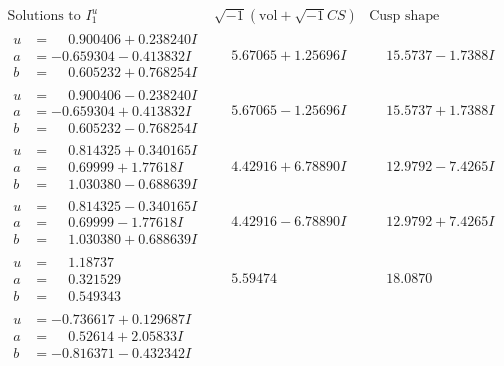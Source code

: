 \documentclass[1p]{elsarticle_modified}
\theoremstyle{definition}
\newcommand{\I}{\sqrt{-1}}
\begin{document}
$$\begin{array}{c|c|c}  
\text{Solutions to }I^u_{1}& \I (\text{vol} + \sqrt{-1}CS) & \text{Cusp shape}\\
 \hline 
\begin{aligned}
u &= \phantom{-}0.900406 + 0.238240 I \\
a &= -0.659304 - 0.413832 I \\
b &= \phantom{-}0.605232 + 0.768254 I\end{aligned}
 & \phantom{-}5.67065 + 1.25696 I & \phantom{-}15.5737 - 1.7388 I \\ \hline\begin{aligned}
u &= \phantom{-}0.900406 - 0.238240 I \\
a &= -0.659304 + 0.413832 I \\
b &= \phantom{-}0.605232 - 0.768254 I\end{aligned}
 & \phantom{-}5.67065 - 1.25696 I & \phantom{-}15.5737 + 1.7388 I \\ \hline\begin{aligned}
u &= \phantom{-}0.814325 + 0.340165 I \\
a &= \phantom{-}0.69999 + 1.77618 I \\
b &= \phantom{-}1.030380 - 0.688639 I\end{aligned}
 & \phantom{-}4.42916 + 6.78890 I & \phantom{-}12.9792 - 7.4265 I \\ \hline\begin{aligned}
u &= \phantom{-}0.814325 - 0.340165 I \\
a &= \phantom{-}0.69999 - 1.77618 I \\
b &= \phantom{-}1.030380 + 0.688639 I\end{aligned}
 & \phantom{-}4.42916 - 6.78890 I & \phantom{-}12.9792 + 7.4265 I \\ \hline\begin{aligned}
u &= \phantom{-}1.18737\phantom{ +0.000000I} \\
a &= \phantom{-}0.321529\phantom{ +0.000000I} \\
b &= \phantom{-}0.549343\phantom{ +0.000000I}\end{aligned}
 & \phantom{-}5.59474\phantom{ +0.000000I} & \phantom{-}18.0870\phantom{ +0.000000I} \\ \hline\begin{aligned}
u &= -0.736617 + 0.129687 I \\
a &= \phantom{-}0.52614 + 2.05833 I \\
b &= -0.816371 - 0.432342 I\end{aligned}

\end{array}$$
\end{document}
